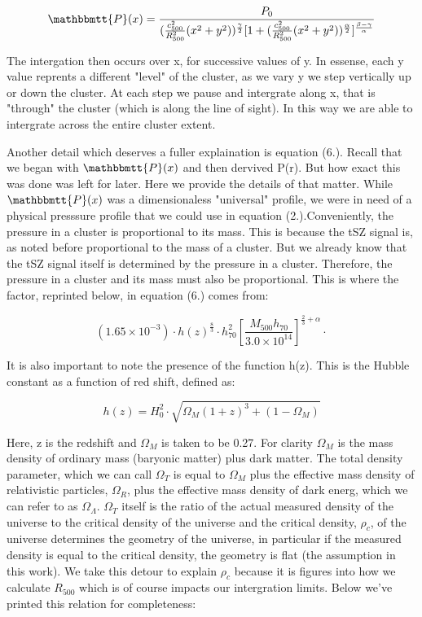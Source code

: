 \documentclass[12pt]{article} %
\begin{document}
\begin{equation}
\mathbbmtt{P}(x)=\frac{P_0}{(\frac{c_{500}^2}{R_{500}^2}(x^2 + y^2))^\frac{\gamma}{2} [1 + (\frac{c_{500}^2}{R_{500}^2}(x^2 + y^2))^\frac{\alpha}{2}]^\frac{\beta - \gamma}{\alpha}} 
\end{equation}

The intergation then occurs over x,  for successive values of y. In essense, each y value reprents a different "level" of the cluster, as we vary y we step vertically up or down the cluster. At each step we pause and intergrate along x, that is "through" the cluster (which is along the line of sight). In this way we are able to intergrate across the entire cluster extent. 

Another detail which deserves a fuller explaination is equation (6.). Recall that we began with $\mathbbmtt{P}(x)$ and then dervived P(r). But how exact this was done was left for later. Here we provide the details of that matter. While$ \mathbbmtt{P}(x)$ was a dimensionaless "universal" profile, we were in need of a physical presssure profile that we could use in equation (2.).Conveniently, the pressure in a cluster is proportional to its mass. This is because the tSZ signal is, as noted before proportional to the mass of a cluster. But we already know that the tSZ signal itself is determined by the pressure in a cluster. Therefore, the pressure in a cluster and its mass must also be proportional.  This is where the factor, reprinted below, in equation (6.) comes from:

\begin{equation}
(1.65 \times 10^{-3}) \cdotp h(z)^\frac{8}{3} \cdotp h^2_{70}[\frac{M_{500}h_{70}}{3.0 \times 10^{14}}]^{\frac{2}{3} + \alpha} \cdotp 
\end{equation}

It is also important to note the presence of the function h(z). This is the Hubble constant as a function of red shift, defined as:
 
\begin{equation}
h(z) =H_0^2 \cdotp \sqrt{\Omega_M(1 + z)^3 + (1 - \Omega_M)}
\end{equation}

Here, z is the redshift and $\Omega_M$ is taken to be 0.27. For clarity $\Omega_M$ is the mass density of ordinary mass (baryonic matter) plus dark matter. The total density parameter, which we can call $\Omega_T$ is equal to $\Omega_M$  plus the effective mass density of relativistic particles, $\Omega_R$, plus the effective mass density of dark energ, which we can refer to as $\Omega_\Lambda$. $\Omega_T$ itself is the ratio of the actual measured density of the universe to the critical density of the universe and the critical density,  $\rho_c$, of the universe determines the geometry of the universe, in particular if the measured density is equal to the critical density, the geometry is flat (the assumption in this work). We take this detour to explain $\rho_c$ because it is figures into how we calculate $R_{500}$ which is of course impacts our intergration limits. Below we've printed this relation for completeness: 
\end{document}
